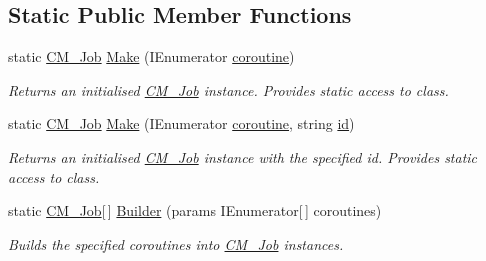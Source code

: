 \subsection*{Static Public Member Functions}
\begin{DoxyCompactItemize}
\item 
static \hyperlink{class_c_m___job}{C\+M\+\_\+\+Job} \hyperlink{class_c_m___job_a1ffab1654cb694e80dd1af68418048bb}{Make} (I\+Enumerator \hyperlink{class_c_m___job_a872a3e122dfc58a365f659918ba0fb82}{coroutine})
\begin{DoxyCompactList}\small\item\em Returns an initialised \hyperlink{class_c_m___job}{C\+M\+\_\+\+Job} instance. Provides static access to class. \end{DoxyCompactList}\item 
static \hyperlink{class_c_m___job}{C\+M\+\_\+\+Job} \hyperlink{class_c_m___job_ac2d0aa32b0e614d9a3133675c35a9866}{Make} (I\+Enumerator \hyperlink{class_c_m___job_a872a3e122dfc58a365f659918ba0fb82}{coroutine}, string \hyperlink{class_c_m___job_a19b93ec8fb1f643db06e79ad0710732b}{id})
\begin{DoxyCompactList}\small\item\em Returns an initialised \hyperlink{class_c_m___job}{C\+M\+\_\+\+Job} instance with the specified id. Provides static access to class. \end{DoxyCompactList}\item 
static \hyperlink{class_c_m___job}{C\+M\+\_\+\+Job}\mbox{[}$\,$\mbox{]} \hyperlink{class_c_m___job_a50cbb0f136c48addf0badefc62cecc6d}{Builder} (params I\+Enumerator\mbox{[}$\,$\mbox{]} coroutines)
\begin{DoxyCompactList}\small\item\em Builds the specified coroutines into \hyperlink{class_c_m___job}{C\+M\+\_\+\+Job} instances. \end{DoxyCompactList}\end{DoxyCompactItemize}
